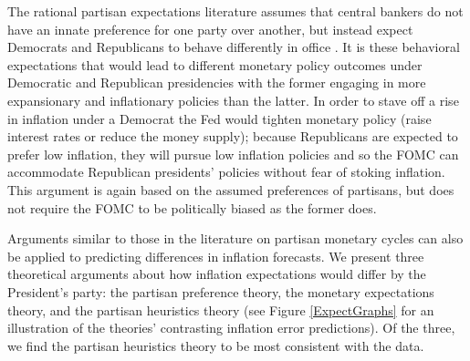 \documentclass[a4paper]{article}
\begin{document}
The rational partisan expectations literature assumes that central bankers do not have an innate preference for one party over another, but instead expect Democrats and Republicans to behave differently in office \citep{Alesina1991,Hibbs1994}. It is these behavioral expectations that would lead to different monetary policy outcomes under Democratic and Republican presidencies with the former engaging in more expansionary and inflationary policies than the latter. In order to stave off a rise in inflation under a Democrat the Fed would tighten monetary policy (raise interest rates or reduce the money supply); because Republicans are expected to prefer low inflation, they will pursue low inflation policies and so the FOMC can accommodate Republican presidents' policies without fear of stoking inflation. This argument is again based on the assumed preferences of partisans, but does not require the FOMC to be politically biased as the former does. 

Arguments similar to those in the literature on partisan monetary cycles can also be applied to predicting differences in inflation forecasts. We present three theoretical arguments about how inflation expectations would differ by the President's party: the partisan preference theory, the monetary expectations theory, and the partisan heuristics theory (see Figure \ref{ExpectGraphs} for an illustration of the theories' contrasting inflation error predictions). Of the three, we find the partisan heuristics theory to be most consistent with the data.




\end{document}
